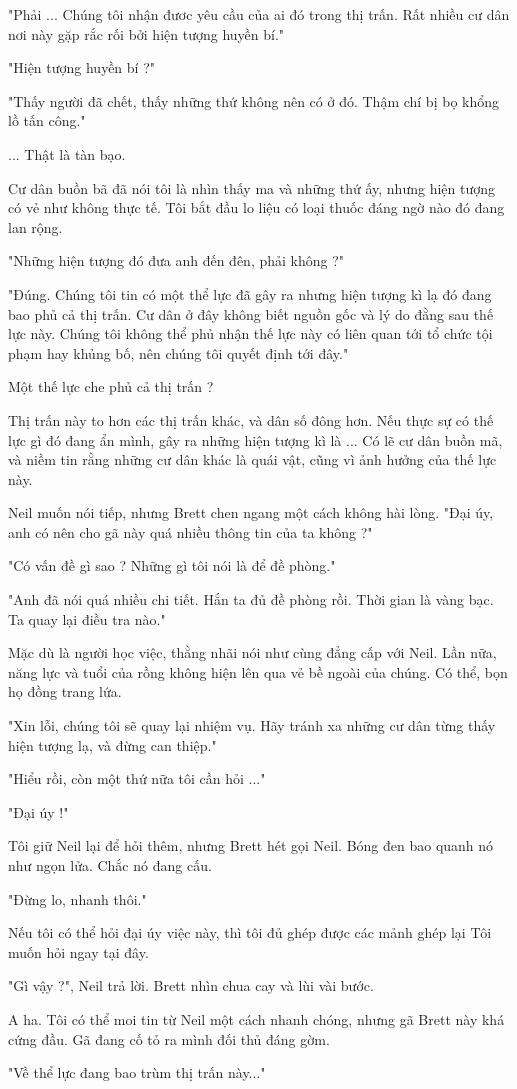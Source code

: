 "Phải ... Chúng tôi nhận đươc yêu cầu của ai đó trong thị trấn. Rất nhiều cư dân nơi này gặp rắc rối bởi hiện tượng huyền bí."

"Hiện tượng huyền bí ?"

"Thấy người đã chết, thấy những thứ không nên có ở đó. Thậm chí bị bọ khổng lồ tấn công."

... Thật là tàn bạo.

Cư dân buồn bã đã nói tôi là nhìn thấy ma và những thứ ấy, nhưng hiện tượng có vẻ như không thực tế. Tôi bắt đầu lo liệu có loại thuốc đáng ngờ nào đó đang lan rộng.

"Những hiện tượng đó đưa anh đến đên, phải không ?"

"Đúng. Chúng tôi tin có một thể lực đã gây ra nhưng hiện tượng kì lạ đó đang bao phủ cả thị trấn. Cư dân ở đây không biết nguồn gốc và lý do đằng sau thế lực này. Chúng tôi không thể phủ nhận thế lực này có liên quan tới tổ chức tội phạm hay khủng bố, nên chúng tôi quyết định tới đây."

Một thế lực che phủ cả thị trấn ?

Thị trấn này to hơn các thị trấn khác, và dân số đông hơn. Nếu thực sự có thế lực gì đó đang ẩn mình, gây ra những hiện tượng kì là ... Có lẽ cư dân buồn mã, và niềm tin rằng những cư dân khác là quái vật, cũng vì ảnh hưởng của thế lực này.

Neil muốn nói tiếp, nhưng Brett chen ngang một cách không hài lòng. "Đại úy, anh có nên cho gã này quá nhiều thông tin của ta không ?"

"Có vấn đề gì sao ? Những gì tôi nói là để đề phòng."

"Anh đã nói quá nhiều chi tiết. Hắn ta đủ đề phòng rồi. Thời gian là vàng bạc. Ta quay lại điều tra nào."

Mặc dù là người học việc, thằng nhãi nói như cùng đẳng cấp với Neil. Lần nữa, năng lực và tuổi của rồng không hiện lên qua vẻ bề ngoài của chúng. Có thể, bọn họ đồng trang lứa.

"Xin lỗi, chúng tôi sẽ quay lại nhiệm vụ. Hãy tránh xa những cư dân từng thấy hiện tượng lạ, và đừng can thiệp."

"Hiểu rồi, còn một thứ nữa tôi cần hỏi ..."

"Đại úy !"

Tôi giữ Neil lại để hỏi thêm, nhưng Brett hét gọi Neil. Bóng đen bao quanh nó như ngọn lửa. Chắc nó đang cấu.

"Đừng lo, nhanh thôi."

Nếu tôi có thể hỏi đại úy việc này, thì tôi đủ ghép được các mảnh ghép lại Tôi muốn hỏi ngay tại đây.

"Gì vậy ?", Neil trả lời. Brett nhìn chua cay và lùi vài bước.

A ha. Tôi có thể moi tin từ Neil một cách nhanh chóng, nhưng gã Brett này khá cứng đầu. Gã đang cố tỏ ra mình đối thủ đáng gờm.

"Về thể lực đang bao trùm thị trấn này..." \\


 